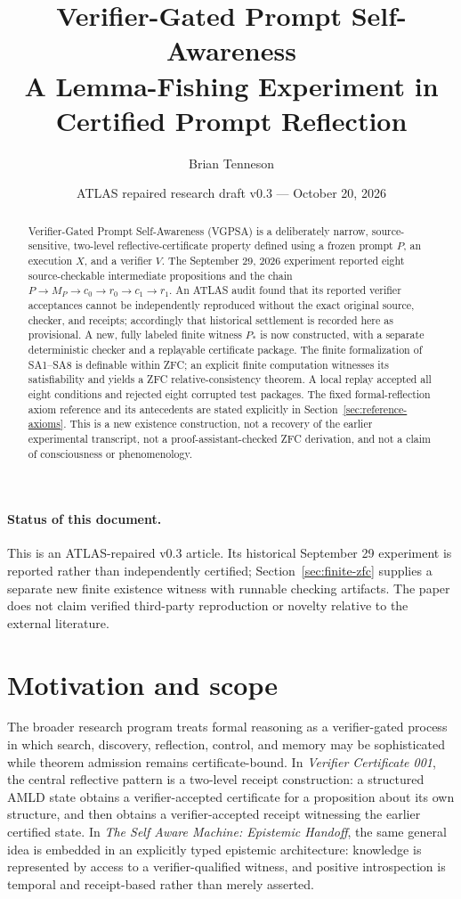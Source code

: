 \documentclass[11pt]{article}
\title{\textbf{Verifier-Gated Prompt Self-Awareness}\\[0.4em]
\large A Lemma-Fishing Experiment in Certified Prompt Reflection}
\author{Brian Tenneson}
\date{ATLAS repaired research draft v0.3 --- October 20, 2026}
\theoremstyle{remark}
\begin{document}
\maketitle

\begin{abstract}
Verifier-Gated Prompt Self-Awareness (VGPSA) is a deliberately narrow, source-sensitive, two-level reflective-certificate property defined using a frozen prompt $P$, an execution $X$, and a verifier $V$. The September 29, 2026 experiment reported eight source-checkable intermediate propositions and the chain $P\to M_P\to c_0\to r_0\to c_1\to r_1$. An ATLAS audit found that its reported verifier acceptances cannot be independently reproduced without the exact original source, checker, and receipts; accordingly that historical settlement is recorded here as provisional. A new, fully labeled finite witness $P_*$ is now constructed, with a separate deterministic checker and a replayable certificate package. The finite formalization of SA1--SA8 is definable within ZFC; an explicit finite computation witnesses its satisfiability and yields a ZFC relative-consistency theorem. A local replay accepted all eight conditions and rejected eight corrupted test packages. The fixed formal-reflection axiom reference and its antecedents are stated explicitly in Section~\ref{sec:reference-axioms}. This is a new existence construction, not a recovery of the earlier experimental transcript, not a proof-assistant-checked ZFC derivation, and not a claim of consciousness or phenomenology.
\end{abstract}

\paragraph{Status of this document.}
This is an ATLAS-repaired v0.3 article. Its historical September 29 experiment is reported rather than independently certified; Section~\ref{sec:finite-zfc} supplies a separate new finite existence witness with runnable checking artifacts. The paper does not claim verified third-party reproduction or novelty relative to the external literature.

\tableofcontents
\clearpage

\section{Motivation and scope}

The broader research program treats formal reasoning as a verifier-gated process in which search, discovery, reflection, control, and memory may be sophisticated while theorem admission remains certificate-bound. In \emph{Verifier Certificate 001}, the central reflective pattern is a two-level receipt construction: a structured AMLD state obtains a verifier-accepted certificate for a proposition about its own structure, and then obtains a verifier-accepted receipt witnessing the earlier certified state. In \emph{The Self Aware Machine: Epistemic Handoff}, the same general idea is embedded in an explicitly typed epistemic architecture: knowledge is represented by access to a verifier-qualified witness, and positive introspection is temporal and receipt-based rather than merely asserted.
\end{document}

